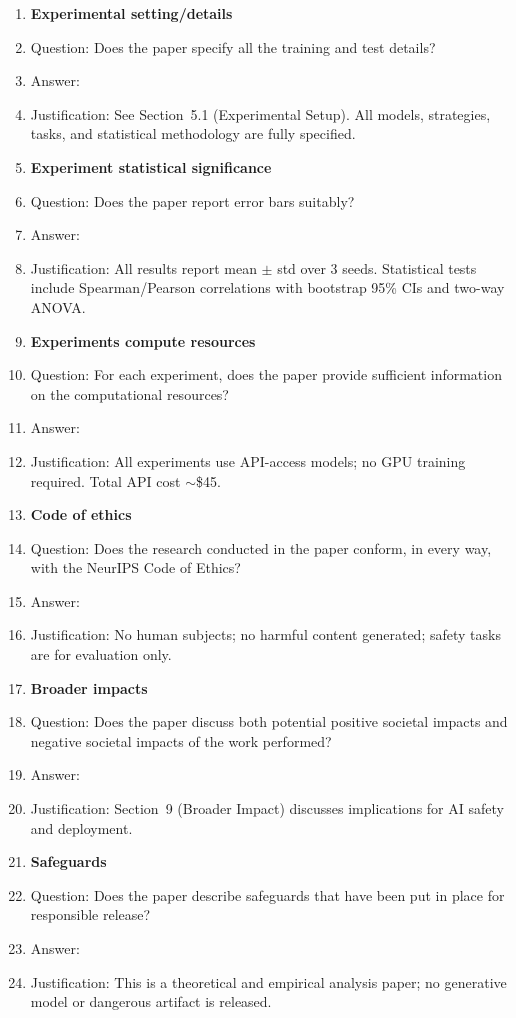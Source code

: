 \documentclass{article}
\begin{document}
\begin{enumerate}
\item {\bf Experimental setting/details}
    \item[] Question: Does the paper specify all the training and test details?
    \item[] Answer: \answerYes{}
    \item[] Justification: See Section~5.1 (Experimental Setup). All models, strategies, tasks, and statistical methodology are fully specified.

\item {\bf Experiment statistical significance}
    \item[] Question: Does the paper report error bars suitably?
    \item[] Answer: \answerYes{}
    \item[] Justification: All results report mean $\pm$ std over 3 seeds. Statistical tests include Spearman/Pearson correlations with bootstrap 95\% CIs and two-way ANOVA.

\item {\bf Experiments compute resources}
    \item[] Question: For each experiment, does the paper provide sufficient information on the computational resources?
    \item[] Answer: \answerYes{}
    \item[] Justification: All experiments use API-access models; no GPU training required. Total API cost $\sim$\$45.

\item {\bf Code of ethics}
    \item[] Question: Does the research conducted in the paper conform, in every way, with the NeurIPS Code of Ethics?
    \item[] Answer: \answerYes{}
    \item[] Justification: No human subjects; no harmful content generated; safety tasks are for evaluation only.

\item {\bf Broader impacts}
    \item[] Question: Does the paper discuss both potential positive societal impacts and negative societal impacts of the work performed?
    \item[] Answer: \answerYes{}
    \item[] Justification: Section~9 (Broader Impact) discusses implications for AI safety and deployment.

\item {\bf Safeguards}
    \item[] Question: Does the paper describe safeguards that have been put in place for responsible release?
    \item[] Answer: \answerNA{}
    \item[] Justification: This is a theoretical and empirical analysis paper; no generative model or dangerous artifact is released.


\end{enumerate}
\end{document}
